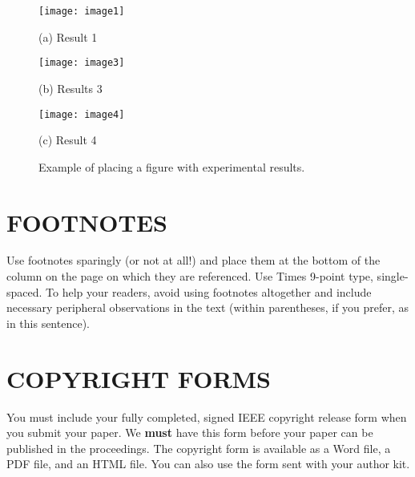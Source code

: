 \documentclass{article}
\begin{document}
\begin{figure}[htb]

\begin{minipage}[b]{1.0\linewidth}
  \centering
  \centerline{\texttt{[image: image1]}}
  \centerline{(a) Result 1}\medskip
\end{minipage}
%
\begin{minipage}[b]{.48\linewidth}
  \centering
  \centerline{\texttt{[image: image3]}}
  \centerline{(b) Results 3}\medskip
\end{minipage}
\hfill
\begin{minipage}[b]{0.48\linewidth}
  \centering
  \centerline{\texttt{[image: image4]}}
  \centerline{(c) Result 4}\medskip
\end{minipage}
%
\caption{Example of placing a figure with experimental results.}
\label{fig:res}
%
\end{figure}

\vfill
\pagebreak


\section{FOOTNOTES}
\label{sec:foot}

Use footnotes sparingly (or not at all!) and place them at the bottom of the
column on the page on which they are referenced. Use Times 9-point type,
single-spaced. To help your readers, avoid using footnotes altogether and
include necessary peripheral observations in the text (within parentheses, if
you prefer, as in this sentence).


\section{COPYRIGHT FORMS}
\label{sec:copyright}

You must include your fully completed, signed IEEE copyright release form when
you submit your paper. We {\bf must} have this form before your paper can be
published in the proceedings.  The copyright form is available as a Word file,
a PDF file, and an HTML file. You can also use the form sent with your author
kit.
\end{document}
